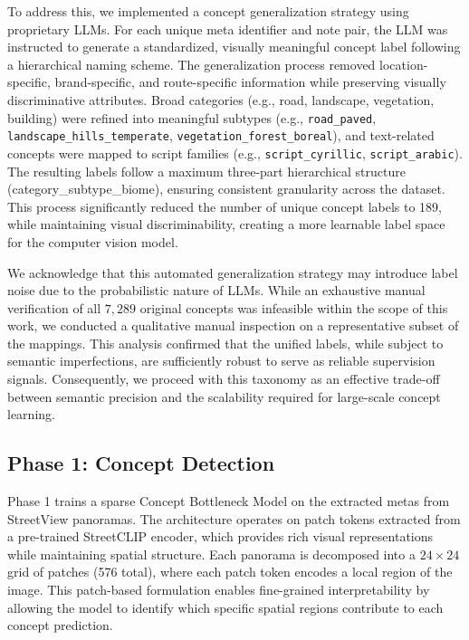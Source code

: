 \documentclass{article}
\begin{document}
To address this, we implemented a concept generalization strategy using proprietary LLMs. For each unique meta identifier and note pair, the LLM was instructed to generate a standardized, visually meaningful concept label following a hierarchical naming scheme. The generalization process removed location-specific, brand-specific, and route-specific information while preserving visually discriminative attributes. Broad categories (e.g., road, landscape, vegetation, building) were refined into meaningful subtypes (e.g., \texttt{road\_paved}, \texttt{landscape\_hills\_temperate}, \texttt{vegetation\_forest\_boreal}), and text-related concepts were mapped to script families (e.g., \texttt{script\_cyrillic}, \texttt{script\_arabic}). The resulting labels follow a maximum three-part hierarchical structure (category\_subtype\_biome), ensuring consistent granularity across the dataset. This process significantly reduced the number of unique concept labels to 189, while maintaining visual discriminability, creating a more learnable label space for the computer vision model.

We acknowledge that this automated generalization strategy may introduce label noise due to the probabilistic nature of LLMs. While an exhaustive manual verification of all $7,289$ original concepts was infeasible within the scope of this work, we conducted a qualitative manual inspection on a representative subset of the mappings. This analysis confirmed that the unified labels, while subject to semantic imperfections, are sufficiently robust to serve as reliable supervision signals. Consequently, we proceed with this taxonomy as an effective trade-off between semantic precision and the scalability required for large-scale concept learning.


\subsection{Phase 1: Concept Detection}

Phase 1 trains a sparse Concept Bottleneck Model on the extracted metas from StreetView panoramas. The architecture operates on patch tokens extracted from a pre-trained StreetCLIP encoder, which provides rich visual representations while maintaining spatial structure. Each panorama is decomposed into a $24 \times 24$ grid of patches (576 total), where each patch token encodes a local region of the image. This patch-based formulation enables fine-grained interpretability by allowing the model to identify which specific spatial regions contribute to each concept prediction.
\end{document}

